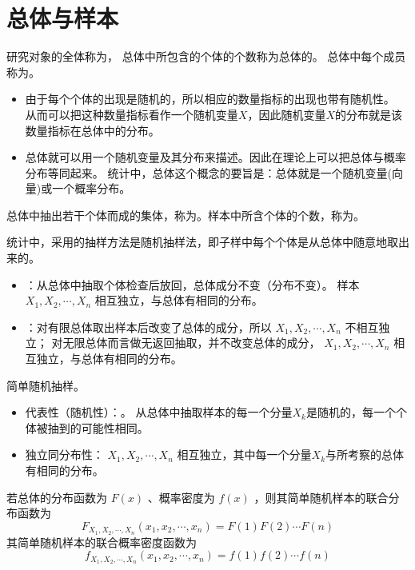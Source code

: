 \section{总体与样本}

 研究对象的全体称为，
总体中所包含的个体的个数称为总体的。
总体中每个成员称为。

\begin{itemize}[leftmargin=\paritemindent]
    \item 由于每个个体的出现是随机的，所以相应的数量指标的出现也带有随机性。
    从而可以把这种数量指标看作一个随机变量$ X $，因此随机变量$ X $的分布就是该数量指标在总体中的分布。
    \item 总体就可以用一个随机变量及其分布来描述。因此在理论上可以把总体与概率分布等同起来。
    统计中，总体这个概念的要旨是：总体就是一个随机变量(向量)或一个概率分布。
\end{itemize}

总体中抽出若干个体而成的集体，称为。样本中所含个体的个数，称为。

 统计中，采用的抽样方法是随机抽样法，即子样中每个个体是从总体中随意地取出来的。
\begin{itemize}[leftmargin=\subparitemindent]
    \item {}：从总体中抽取个体检查后放回，总体成分不变（分布不变）。
    样本 $ X_1, X_2, \cdots, X_n $ 相互独立，与总体有相同的分布。
    \item {}：对有限总体取出样本后改变了总体的成分，所以 $ X_1, X_2, \cdots, X_n $ 不相互独立；
    对无限总体而言做无返回抽取，并不改变总体的成分， $ X_1, X_2, \cdots, X_n $ 相互独立，与总体有相同的分布。
\end{itemize}

 简单随机抽样。
\begin{itemize}[leftmargin=\subparitemindent]
    \item 代表性（随机性）：。 从总体中抽取样本的每一个分量$ X_k $是随机的，每一个个体被抽到的可能性相同。
    \item 独立同分布性： $ X_1, X_2, \cdots, X_n $ 相互独立，其中每一个分量$ X_k $与所考察的总体有相同的分布。
\end{itemize}

 若总体的分布函数为 $ F(x) $ 、概率密度为 $ f(x) $ ，则其简单随机样本的联合分布函数为
\begin{equation}
    F_{X_1, X_2, \cdots, X_n}(x_1, x_2, \cdots, x_n) = F(1) F(2) \cdots F(n)
\end{equation}
其简单随机样本的联合概率密度函数为
\begin{equation}
    f_{X_1, X_2, \cdots, X_n}(x_1, x_2, \cdots, x_n) = f(1) f(2) \cdots f(n)
\end{equation}

